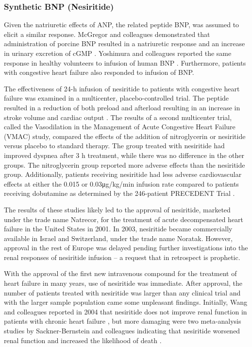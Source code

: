 \documentclass[14pt,a4paper,onecolumn]{article}
\begin{document}
\subsubsection{Synthetic BNP (Nesiritide)}
Given the natriuretic effects of ANP, the related peptide BNP, was assumed to elicit a similar
response. McGregor and colleagues demonstrated that administration of porcine BNP resulted in a natriuretic response and an increase in urinary excretion of cGMP \citep{McGregor1990}. Yoshimura and colleagues reported the same response in healthy volunteers to infusion of human BNP \citep{Yoshimura1991}. Furthermore, patients with congestive heart failure also responded to infusion of BNP.

The effectiveness of 24-h infusion of nesiritide to patients with congestive heart failure was examined in a multicenter, placebo-controlled trial. The peptide resulted in a reduction of both preload and afterload resulting in an increase in stroke volume and cardiac output \citep{Mills1999}. The results of a second multicenter trial, called the Vasodilation in the Management of Acute Congestive Heart Failure (VMAC) study, compared the effects of the addition of nitroglycerin or nesiritide versus placebo to standard therapy. The group treated with nesiritide had improved dyspnea after 3 h treatment, while there was no difference in the other groups. The nitroglycerin group reported more adverse effects than the nesiritide group. Additionally, patients receiving nesiritide had less adverse cardiovascular effects at either the 0.015 or 0.03μg/kg/min infusion rate compared to patients receiving dobutamine as determined by the 246-patient PRECEDENT Trial \citep{deLissovoy2003}.

The results of these studies likely led to the approval of nesiritide, marketed under the trade name Natrecor, for the treatment of acute decompensated heart failure in the United States in 2001. In 2003, nesiritide became commercially available in Israel and Switzerland, under the trade name Noratak. However, approval in the rest of Europe was delayed pending further investigations into the renal responses of nesiritide infusion – a request that in retrospect is prophetic.

With the approval of the first new intravenous compound for the treatment of heart failure in many years, use of nesiritide was immediate. After approval, the number of patients treated with nesiritide was larger than any clinical trial and with the larger sample population came some unpleasant findings. Initially, Wang and colleagues reported in 2004 that nesiritide does not improve renal function in patients with chronic heart failure \citep{Wang2004}, but more damaging were two meta-analysis studies by Sackner-Bernstein and colleagues indicating that nesiritide worsened renal function and increased the likelihood of death \citep{Sackner-Bernstein2005a} \citep{Sackner-Bernstein2005b}.
\end{document}
